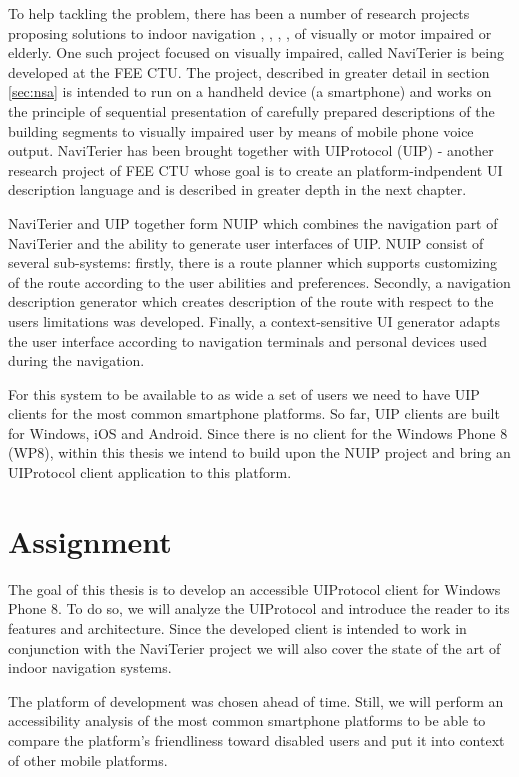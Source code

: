 To help tackling the problem, there has been a number of research projects proposing solutions to indoor navigation \cite{naviterier}, \cite{percept}, \cite{lopez}, \cite{luis}, \cite{riehle} of visually or motor impaired or elderly. One such project focused on visually impaired, called NaviTerier is being developed at the FEE CTU. The project, described in greater detail in section \ref{sec:nsa} is intended to run on a handheld device (a smartphone) and works on the principle of sequential presentation of carefully prepared descriptions of the building segments to visually impaired user by means of mobile phone voice output. NaviTerier has been brought together with UIProtocol (UIP) - another research project of FEE CTU whose goal is to create an platform-indpendent UI description language and is described in greater depth in the next chapter.

NaviTerier and UIP together form NUIP which combines the navigation part of NaviTerier and the ability to generate user interfaces of UIP. NUIP consist of several sub-systems: firstly, there is a route planner which supports customizing of the route according to the user abilities and preferences. Secondly,  a navigation description generator which creates description of the route with respect to the users limitations was developed. Finally, a context-sensitive UI generator \cite{macik2} adapts the user interface according to navigation terminals and personal devices used during the navigation.

For this system to be available to as wide a set of users we need to have UIP clients for the most common smartphone platforms. So far, UIP clients are built for Windows, iOS and Android. Since there is no client for the Windows Phone 8 (WP8), within this thesis we intend to build upon the NUIP project and bring an UIProtocol client application to this platform. 

\section{Assignment}
The goal of this thesis is to develop an accessible UIProtocol client for Windows Phone 8. To do so, we will analyze the UIProtocol and introduce the reader to its features and architecture. Since the developed client is intended to work in conjunction with the NaviTerier project we will also cover the state of the art of indoor navigation systems.

The platform of development was chosen ahead of time. Still, we will perform an accessibility analysis of the most common smartphone platforms to be able to compare the platform's friendliness toward disabled users and put it into context of other mobile platforms.

